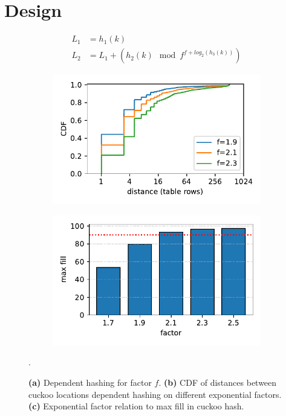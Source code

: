 \section{Design}
\label{sec:design}

\begin{figure}[t]
    \centering
    \begin{subfigure}{0.3\linewidth}
        \begin{align*}
            L_1 &= h_1(k) \\
            L_2 &= L_1 + (h_2(k)\mod f^{f + log_2(h_3(k))})
        \end{align*}
    \end{subfigure}
    \begin{subfigure}{0.3\linewidth}
        \includegraphics[width=0.99\linewidth]{fig/hash_factor.pdf}
    \end{subfigure}
    \begin{subfigure}{0.3\linewidth}
        \includegraphics[width=0.99\linewidth]{fig/hash_fill.pdf}
    \end{subfigure}.
    \vspace{-1em}
    \caption{
    \textbf{(a)} Dependent hashing for factor $f$.
    \textbf{(b)} CDF of distances between cuckoo locations dependent hashing on different exponential factors.
    \textbf{(c)} Exponential factor relation to max fill in cuckoo hash.
    }
    \label{fig:locality-hashing}

\end{figure}




